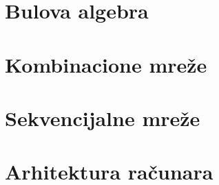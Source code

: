 \section{Bulova algebra}

\section{Kombinacione mre\v ze}

\section{Sekvencijalne mre\v ze}

\section{Arhitektura ra\v cunara}
